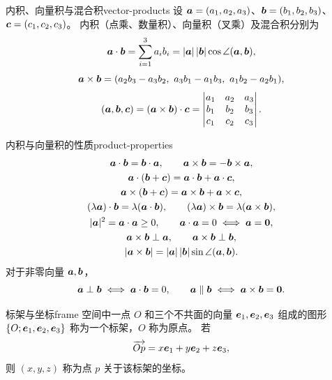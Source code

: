 \begin{definition}{内积、向量积与混合积}{vector-products}
设 $\boldsymbol{a}=(a_1,a_2,a_3)$、$\boldsymbol{b}=(b_1,b_2,b_3)$、$\boldsymbol{c}=(c_1,c_2,c_3)$。
内积（点乘、数量积）、向量积（叉乘）及混合积分别为
\[
\boldsymbol{a}\cdot\boldsymbol{b}=\sum_{i=1}^3a_ib_i
=|\boldsymbol{a}|\,|\boldsymbol{b}|\cos\angle(\boldsymbol{a},\boldsymbol{b}),
\]
\[
\boldsymbol{a}\times\boldsymbol{b}=
(a_2b_3-a_3b_2,\ a_3b_1-a_1b_3,\ a_1b_2-a_2b_1),
\]
\[
(\boldsymbol{a},\boldsymbol{b},\boldsymbol{c})=(\boldsymbol{a}\times\boldsymbol{b})\cdot\boldsymbol{c}
=\begin{vmatrix}a_1&a_2&a_3\\b_1&b_2&b_3\\c_1&c_2&c_3\end{vmatrix}.
\]
\end{definition}

\begin{proposition}{内积与向量积的性质}{product-properties}
\[
\begin{gathered}
\boldsymbol{a}\cdot\boldsymbol{b}=\boldsymbol{b}\cdot\boldsymbol{a},\qquad
\boldsymbol{a}\times\boldsymbol{b}=-\boldsymbol{b}\times\boldsymbol{a},\\
\boldsymbol{a}\cdot(\boldsymbol{b}+\boldsymbol{c})=\boldsymbol{a}\cdot\boldsymbol{b}+\boldsymbol{a}\cdot\boldsymbol{c},\\
\boldsymbol{a}\times(\boldsymbol{b}+\boldsymbol{c})=\boldsymbol{a}\times\boldsymbol{b}+\boldsymbol{a}\times\boldsymbol{c},\\
(\lambda\boldsymbol{a})\cdot\boldsymbol{b}=\lambda(\boldsymbol{a}\cdot\boldsymbol{b}),\qquad
(\lambda\boldsymbol{a})\times\boldsymbol{b}=\lambda(\boldsymbol{a}\times\boldsymbol{b}),\\
|\boldsymbol{a}|^2=\boldsymbol{a}\cdot\boldsymbol{a}\geq0,\qquad
\boldsymbol{a}\cdot\boldsymbol{a}=0\iff\boldsymbol{a}=\boldsymbol{0},\\
\boldsymbol{a}\times\boldsymbol{b}\perp\boldsymbol{a},\qquad
\boldsymbol{a}\times\boldsymbol{b}\perp\boldsymbol{b},\\
|\boldsymbol{a}\times\boldsymbol{b}|=|\boldsymbol{a}|\,|\boldsymbol{b}|\sin\angle(\boldsymbol{a},\boldsymbol{b}).
\end{gathered}
\]
对于非零向量 $\boldsymbol{a},\boldsymbol{b}$，
\[
\boldsymbol{a}\perp\boldsymbol{b}\iff\boldsymbol{a}\cdot\boldsymbol{b}=0,\qquad
\boldsymbol{a}\parallel\boldsymbol{b}\iff\boldsymbol{a}\times\boldsymbol{b}=\boldsymbol{0}.
\]
\end{proposition}

\begin{definition}{标架与坐标}{frame}
空间中一点 $O$ 和三个不共面的向量 $\boldsymbol{e}_1,\boldsymbol{e}_2,\boldsymbol{e}_3$
组成的图形 $\{O;\boldsymbol{e}_1,\boldsymbol{e}_2,\boldsymbol{e}_3\}$ 称为一个标架，$O$ 称为原点。
若
\[
\overrightarrow{Op}=x\boldsymbol{e}_1+y\boldsymbol{e}_2+z\boldsymbol{e}_3,
\]
则 $(x,y,z)$ 称为点 $p$ 关于该标架的坐标。
\end{definition}

